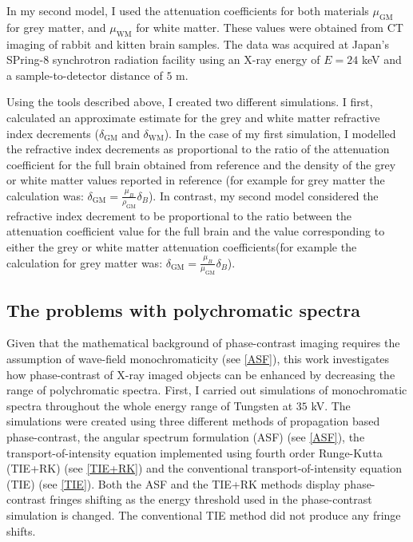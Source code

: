 \documentclass[10pt, a4paper, singlespacing]{report}
\begin{document}
In my second model, I used the attenuation coefficients for both materials $\mu_{\mathrm{GM}}$ for grey matter, and $\mu_{\mathrm{WM}}$ for white matter. These values were obtained from CT imaging of rabbit and kitten brain samples. The data was acquired at Japan's SPring-8 synchrotron radiation facility using an X-ray energy of $E = 24$ keV and a sample-to-detector distance of $5$ m\cite{Linda}.

Using the tools described above, I created two different simulations. I first, calculated an approximate estimate for the grey and white matter refractive index decrements ($\delta_{\mathrm{GM}}$ and $\delta_{\mathrm{WM}}$). In the case of my first simulation, I modelled the refractive index decrements as proportional to the ratio of the attenuation coefficient for the full brain obtained from reference \cite{NIST} and the density of the grey or white matter values reported in reference \cite{ITIS} (for example for grey matter the calculation was: $\delta_{\mathrm{GM}} = \frac{\mu_B}{\rho_{\mathrm{GM}}} \delta_B$). In contrast, my second model considered the refractive index decrement to be proportional to the ratio between the attenuation coefficient value for the full brain and the value corresponding to either the grey or white matter attenuation coefficients(for example the calculation for grey matter was: $\delta_{\mathrm{GM}} = \frac{\mu_B}{\mu_{\mathrm{GM}}} \delta_B$). 


\subsection{The problems with polychromatic spectra}\label{poly}
Given that the mathematical background of phase-contrast imaging requires the assumption of wave-field monochromaticity (see \ref{ASF}), this work investigates how phase-contrast of X-ray imaged objects can be enhanced by decreasing the range of polychromatic spectra. 
First, I carried out simulations of monochromatic spectra throughout the whole energy range of Tungsten at $35$ kV. The simulations were created using three different methods of propagation based phase-contrast, the angular spectrum formulation (ASF) (see \ref{ASF}), the transport-of-intensity equation implemented using fourth order Runge-Kutta (TIE+RK) (see \ref{TIE+RK}) and the conventional transport-of-intensity equation (TIE) (see \ref{TIE}). Both the ASF and the TIE+RK methods display phase-contrast fringes shifting as the energy threshold used in the phase-contrast simulation is changed. The conventional TIE method did not produce any fringe shifts. 
\end{document}
